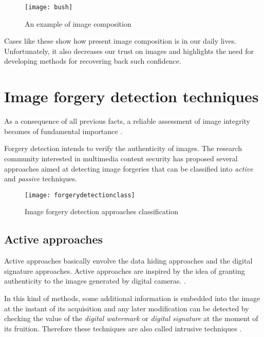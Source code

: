 \begin{figure}[!h]
  \begin{center}
    \texttt{[image: bush]}
  \end{center}
  \caption{An example of image composition}\label{fig:bush}
\end{figure}

Cases like these show how present image composition is in our daily lives. Unfortunately, it also decreases our trust on images and highlights the need for developing methods for recovering back such confidence.

\section{Image forgery detection techniques}

As a consequence of all previous facts, a reliable assessment of image integrity becomes of fundamental importance\cite{zhu2004seeing} \cite{farid2009digital} \cite{piva2013overview}.

Forgery detection intends to verify the authenticity of images.  The research community interested in multimedia content security has proposed several approaches aimed at detecting image forgeries that can be classified into \emph{active} and \emph{passive} techniques.

\begin{figure}[!h]
  \begin{center}
    \texttt{[image: forgerydetectionclass]}
  \end{center}
  \caption{Image forgery detection approaches classification}
    \label{fig:forgerydetectionclass}
\end{figure}

\subsection{Active approaches}

Active approaches basically envolve the data hiding approaches and the digital signature approaches. Active approaches are inspired by the idea of granting authenticity to the images generated by digital cameras. \cite{friedman1993trustworthy} \cite{blythe2004secure}. 

In this kind of methods, some additional information is embedded into the image at the instant of its acquisition and any later modification can be detected by checking the value of the \emph{digital watermark} \cite{cox2002digital}\cite{katzenbeisser2000information}\cite{cox2007digital} or \emph{digital signature}\cite{rivest1978method}\cite{pointcheval2000security}\cite{nikolaidis1996copyright} at the moment of its fruition. Therefore these techniques are also called intrusive techniques \cite{mahdian2010bibliography}. 

